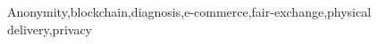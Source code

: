 \documentclass[5p,times]{elsarticle}
\begin{document}
\begin{frontmatter}

\title{\TITLE}

\begin{abstract}
\ABSTRACT{}
\end{abstract}

\begin{keyword}
Anonymity\sep blockchain\sep diagnosis\sep e-commerce\sep fair-exchange\sep physical delivery\sep privacy
\end{keyword}

\end{frontmatter}


\def\JOURNAL{\JOURNALELS}
\newcommand{\printbibliography}{


}
\def\FORMAT{\DOUBLECOLUMN}


\end{document}
